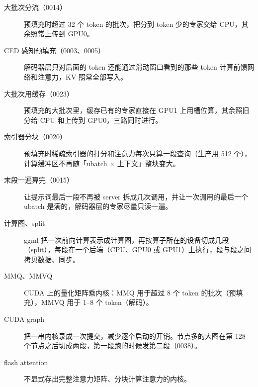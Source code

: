\documentclass[11pt,a4paper]{article}
\begin{document}
\begin{description}
  \item[大批次分流（0014）] 预填充时超过 32 个 token 的批次，把分到 token 少的专家交给 CPU，其余照常上传到 GPU0。
  \item[CED 感知预填充（0003、0005）] 解码器层只对后面的 token 还能通过滑动窗口看到的那些 token 计算前馈网络和注意力，KV 照常全部写入。
  \item[大批次用缓存（0023）] 预填充的大批次里，缓存已有的专家直接在 GPU1 上用槽位算，其余照旧分给 CPU 和上传到 GPU0，三路同时进行。
  \item[索引器分块（0020）] 预填充时稀疏索引器的打分和注意力每次只算一段查询（生产用 512 个），计算缓冲区不再随「ubatch × 上下文」整块变大。
  \item[末段一遍算完（0015）] 让提示词最后一段不再被 server 拆成几次调用，并让一次调用的最后一个 ubatch 是满的，解码器层的专家尽量只读一遍。
  \item[计算图、split] ggml 把一次前向计算表示成计算图，再按算子所在的设备切成几段（split），每段在一个后端（CPU、GPU0 或 GPU1）上执行，段与段之间拷贝数据、同步。
  \item[MMQ、MMVQ] CUDA 上的量化矩阵乘内核：MMQ 用于超过 8 个 token 的批次（预填充），MMVQ 用于 1--8 个 token（解码）。
  \item[CUDA graph] 把一串内核录成一次提交，减少逐个启动的开销。节点多的大图在第 128 个节点之后切成两段，第一段跑的时候发第二段（0038）。
  \item[flash attention] 不显式存出完整注意力矩阵、分块计算注意力的内核。
\end{description}
\end{document}
